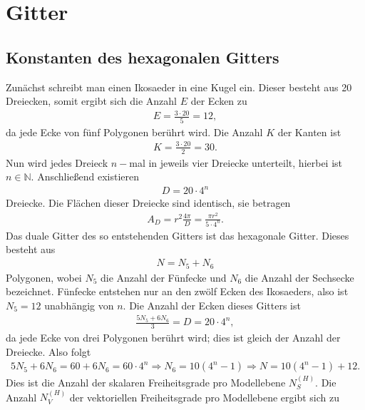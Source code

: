 \documentclass{book}
\begin{document}
\section{Gitter}
\label{sec:gitter}

\subsection{Konstanten des hexagonalen Gitters}
\label{sec:konstanten_des_hexagonalen_gitters}

Zunächst schreibt man einen Ikosaeder in eine Kugel ein. Dieser besteht aus 20 Dreiecken, somit ergibt sich die Anzahl $E$ der Ecken zu
%
\begin{eqnarray}
E = \frac{3\cdot 20}{5} = 12, 
\end{eqnarray}
%
da jede Ecke von fünf Polygonen berührt wird. Die Anzahl $K$ der Kanten ist
%
\begin{eqnarray}
K = \frac{3\cdot 20}{2} = 30.
\end{eqnarray}
%
Nun wird jedes Dreieck $n-$mal in jeweils vier Dreiecke unterteilt, hierbei ist $n\in\mathbb{N}$. Anschließend existieren
%
\begin{eqnarray}
D = 20\cdot 4^n
\end{eqnarray}
%
Dreiecke. Die Flächen dieser Dreiecke sind identisch, sie betragen
%
\begin{eqnarray}
A_D = r^2\frac{4\pi}{D} = \frac{\pi r^2}{5\cdot 4^n}.
\end{eqnarray}
%
Das duale Gitter des so entstehenden Gitters ist das hexagonale Gitter. Dieses besteht aus
%
\begin{eqnarray}
N = N_5 + N_6
\end{eqnarray}
%
Polygonen, wobei $N_5$ die Anzahl der Fünfecke und $N_6$ die Anzahl der Sechsecke bezeichnet. Fünfecke entstehen nur an den zwölf Ecken des Ikosaeders, also ist $N_5 = 12$ unabhängig von $n$. Die Anzahl der Ecken dieses Gitters ist
%
\begin{eqnarray}
\frac{5N_5 + 6N_6}{3} = D = 20\cdot 4^n, 
\end{eqnarray}
%
da jede Ecke von drei Polygonen berührt wird; dies ist gleich der Anzahl der Dreiecke. Also folgt
%
\begin{eqnarray}
5N_5 + 6N_6 = 60 + 6N_6 = 60\cdot 4^n\Rightarrow N_6 = 10\left(4^n - 1\right)\Rightarrow N = 10\left(4^n - 1\right) + 12.
\end{eqnarray}
%
Dies ist die Anzahl der skalaren Freiheitsgrade pro Modellebene $N_S^{(H)}$. Die Anzahl $N_V^{(H)}$ der vektoriellen Freiheitsgrade pro Modellebene ergibt sich zu
\end{document}
